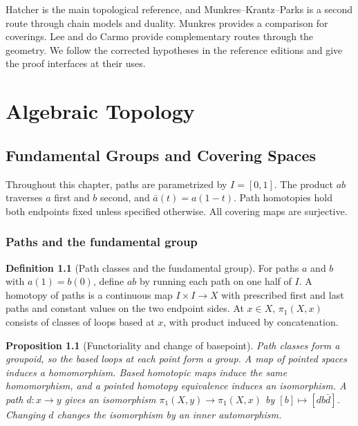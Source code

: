 \documentclass[11pt,oneside,openany]{book}
\theoremstyle{plain}
\newtheorem{proposition}[theorem]{Proposition}
\theoremstyle{definition}
\newtheorem{definition}[theorem]{Definition}
\theoremstyle{remark}
\begin{document}
Hatcher is the main topological reference, and Munkres--Krantz--Parks
is a second route through chain models and duality. Munkres provides
a comparison for coverings. Lee and do Carmo provide complementary
routes through the geometry. We follow the corrected hypotheses in
the reference editions and give the proof interfaces at their uses.

\mainmatter
\part{Algebraic Topology}
\chapter{Fundamental Groups and Covering Spaces}

Throughout this chapter, paths are parametrized by \(I=[0,1]\).
The product \(ab\) traverses \(a\) first and \(b\) second, and
\(\bar a(t)=a(1-t)\). Path homotopies hold both endpoints fixed
unless specified otherwise. All covering maps are surjective.

\section{Paths and the fundamental group}\label{p202:T01}

\begin{definition}[Path classes and the fundamental group]
For paths \(a\) and \(b\) with \(a(1)=b(0)\), define \(ab\) by
running each path on one half of \(I\). A homotopy of paths is
a continuous map \(I\times I\to X\) with prescribed first and
last paths and constant values on the two endpoint sides.
At \(x\in X\), \(\pi_1(X,x)\) consists of classes of loops
based at \(x\), with product induced by concatenation.
\end{definition}

\begin{proposition}[Functoriality and change of basepoint]
\label{prop:p202-path-classes}
Path classes form a groupoid, so the based loops at each point
form a group. A map of pointed spaces induces a homomorphism.
Based homotopic maps induce the same homomorphism, and a
pointed homotopy equivalence induces an isomorphism. A path
\(d:x\to y\) gives an isomorphism
\(\pi_1(X,y)\to\pi_1(X,x)\) by \([b]\mapsto[d b\bar d]\).
Changing \(d\) changes the isomorphism by an inner automorphism.
\end{proposition}
\end{document}
